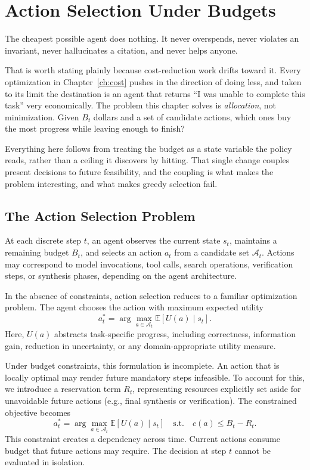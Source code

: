 \chapter{Action Selection Under Budgets}
\label{ch:action-selection}

The cheapest possible agent does nothing. It never overspends, never violates an invariant, never hallucinates a citation, and never helps anyone.

That is worth stating plainly because cost-reduction work drifts toward it. Every optimization in Chapter~\ref{ch:cost} pushes in the direction of doing less, and taken to its limit the destination is an agent that returns ``I was unable to complete this task'' very economically. The problem this chapter solves is \emph{allocation}, not minimization. Given $B_t$ dollars and a set of candidate actions, which ones buy the most progress while leaving enough to finish?

Everything here follows from treating the budget as a state variable the policy reads, rather than a ceiling it discovers by hitting. That single change couples present decisions to future feasibility, and the coupling is what makes the problem interesting, and what makes greedy selection fail.

\section{The Action Selection Problem}

At each discrete step $t$, an agent observes the current state $s_t$, maintains a remaining budget $B_t$, and selects an action $a_t$ from a candidate set $\mathcal{A}_t$. Actions may correspond to model invocations, tool calls, search operations, verification steps, or synthesis phases, depending on the agent architecture.

In the absence of constraints, action selection reduces to a familiar optimization problem. The agent chooses the action with maximum expected utility
\[
a^*_t = \arg\max_{a \in \mathcal{A}_t} \mathbb{E}[U(a) \mid s_t].
\]
Here, $U(a)$ abstracts task-specific progress, including correctness, information gain, reduction in uncertainty, or any domain-appropriate utility measure.

Under budget constraints, this formulation is incomplete. An action that is locally optimal may render future mandatory steps infeasible. To account for this, we introduce a reservation term $R_t$, representing resources explicitly set aside for unavoidable future actions (e.g., final synthesis or verification). The constrained objective becomes
\[
a^*_t = \arg\max_{a \in \mathcal{A}_t} \mathbb{E}[U(a) \mid s_t]
\quad \text{s.t.} \quad c(a) \leq B_t - R_t.
\]
This constraint creates a dependency across time. Current actions consume budget that future actions may require. The decision at step $t$ cannot be evaluated in isolation.

